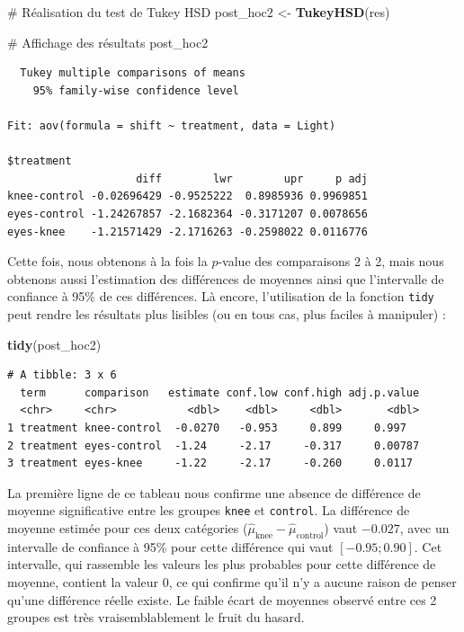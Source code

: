 \documentclass[a4paperpaper,]{article}
\newenvironment{Shaded}{\begin{snugshade}}{\end{snugshade}}
\newcommand{\CommentTok}[1]{\textcolor[rgb]{0.54,0.53,0.53}{#1}}
\newcommand{\KeywordTok}[1]{\textcolor[rgb]{0.12,0.11,0.11}{\textbf{#1}}}
\newcommand{\NormalTok}[1]{\textcolor[rgb]{0.12,0.11,0.11}{#1}}
\newcommand{\StringTok}[1]{\textcolor[rgb]{0.75,0.01,0.01}{#1}}
\begin{document}
\begin{Shaded}
\begin{Highlighting}[]
\CommentTok{# Réalisation du test de Tukey HSD}
\NormalTok{post_hoc2 <-}\StringTok{ }\KeywordTok{TukeyHSD}\NormalTok{(res)}

\CommentTok{# Affichage des résultats}
\NormalTok{post_hoc2}
\end{Highlighting}
\end{Shaded}

\begin{verbatim}
  Tukey multiple comparisons of means
    95% family-wise confidence level

Fit: aov(formula = shift ~ treatment, data = Light)

$treatment
                    diff        lwr        upr     p adj
knee-control -0.02696429 -0.9525222  0.8985936 0.9969851
eyes-control -1.24267857 -2.1682364 -0.3171207 0.0078656
eyes-knee    -1.21571429 -2.1716263 -0.2598022 0.0116776
\end{verbatim}

Cette fois, nous obtenons à la fois la \(p\)-value des comparaisons 2 à 2, mais nous obtenons aussi l'estimation des différences de moyennes ainsi que l'intervalle de confiance à 95\% de ces différences. Là encore, l'utilisation de la fonction \texttt{tidy} peut rendre les résultats plus lisibles (ou en tous cas, plus faciles à manipuler) :

\begin{Shaded}
\begin{Highlighting}[]
\KeywordTok{tidy}\NormalTok{(post_hoc2)}
\end{Highlighting}
\end{Shaded}

\begin{verbatim}
# A tibble: 3 x 6
  term      comparison   estimate conf.low conf.high adj.p.value
  <chr>     <chr>           <dbl>    <dbl>     <dbl>       <dbl>
1 treatment knee-control  -0.0270   -0.953     0.899     0.997  
2 treatment eyes-control  -1.24     -2.17     -0.317     0.00787
3 treatment eyes-knee     -1.22     -2.17     -0.260     0.0117 
\end{verbatim}

La première ligne de ce tableau nous confirme une absence de différence de moyenne significative entre les groupes \texttt{knee} et \texttt{control}. La différence de moyenne estimée pour ces deux catégories (\(\hat{\mu}_{\textrm{knee}} - \hat{\mu}_{\textrm{control}}\)) vaut \(-0.027\), avec un intervalle de confiance à 95\% pour cette différence qui vaut \([-0.95 ; 0.90]\). Cet intervalle, qui rassemble les valeurs les plus probables pour cette différence de moyenne, contient la valeur 0, ce qui confirme qu'il n'y a aucune raison de penser qu'une différence réelle existe. Le faible écart de moyennes observé entre ces 2 groupes est très vraisemblablement le fruit du hasard.
\end{document}
